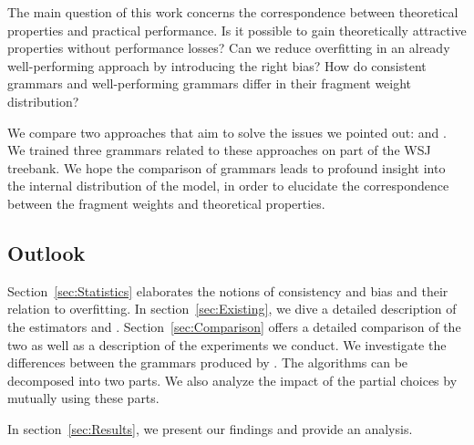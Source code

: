 The main question of this work concerns the correspondence between theoretical properties and practical performance. Is it possible to gain theoretically attractive properties without performance losses? Can we reduce overfitting in an already well-performing approach by introducing the right bias? How do consistent grammars and well-performing grammars differ in their fragment weight distribution?

We compare two approaches that aim to solve the issues we pointed out: \ddop{}\cite{sangati2011} and \dops{}\cite{zollmann 2005}. 
We trained three grammars related to these approaches on part of the WSJ treebank. We hope the comparison of grammars leads to profound insight into the internal distribution of the model, in order to elucidate the correspondence between the fragment weights and theoretical properties.

\subsection{Outlook}
Section~\ref{sec:Statistics} elaborates the notions of consistency and bias and their relation to overfitting.
In section~\ref{sec:Existing}, we dive a detailed description of the estimators \ddop{} and \dops{}.
Section~\ref{sec:Comparison} offers a detailed comparison of the two as well as a description of the experiments we conduct. 
We investigate the differences between the grammars produced by \ddop{} \dops{}. The algorithms can be decomposed into two parts. We also analyze the impact of the partial choices by mutually using these parts.

In section~\ref{sec:Results}, we present our findings and provide an analysis. 


